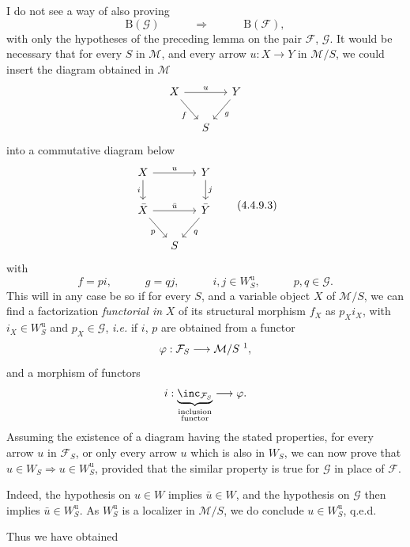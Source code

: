 I do not see a way of also proving
\[
\mathrm{B}(\mathcal{G}) \qquad\quad \Longrightarrow \qquad\quad \mathrm{B}(\mathcal{F}),
\]
with only the hypotheses of the preceding lemma on the pair $\mathcal{F}$, $\mathcal{G}$. It would be necessary that for every $S$ in $\mathcal{M}$, and every arrow
$u : X \longrightarrow Y$ in $\mathcal{M}/S$, we could insert the diagram obtained in $\mathcal{M}$
\[
\begin{tikzcd}[column sep=small]
X \arrow[rr, "u"] \arrow[dr, "f"'] & & Y \arrow[dl, "g"] \\
& S &
\end{tikzcd}
\]
into a commutative diagram below
\[
\begin{tikzcd}[column sep=small]
X \arrow[rr, "u"] \arrow[d, "i"'] & & Y \arrow[d, "j"] \\
\bar{X} \arrow[rr, "\bar{u}"] \arrow[dr, "p"'] & & \bar{Y} \arrow[dl, "q"] \\
& S &
\end{tikzcd}
\tag*{(4.4.9.3)}
\]
with
\[
f = pi, \qquad\quad g = qj, \qquad\quad i, j \in W^{\mathrm{u}}_S, \qquad\quad p, q \in \mathcal{G}.
\]
This will in any case be so if for every $S$, and a variable object $X$ of $\mathcal{M}/S$, we can find a factorization \textit{functorial in} $X$ of its structural morphism $f_X$ as $p_X i_X$, with $i_X \in W^{\mathrm{u}}_S$ and $p_X \in \mathcal{G}$, \textit{i.e.} if $i$, $p$ are obtained from a functor
\[
\varphi : \mathcal{F}_S \longrightarrow \mathcal{M}/S \ \text{\footnotemark},
\]
and a morphism of functors
\[
i : \underbrace{\inc_{\mathcal{F}_S}}_{\substack{\text{inclusion}\\ \text{functor}}} \longrightarrow \varphi.
\]
Assuming the existence of a diagram having the stated properties, for every arrow $u$ in $\mathcal{F}_S$, or only every arrow $u$ which is also in $W_S$, we can now prove that $u \in W_S \Longrightarrow u \in W^{\mathrm{u}}_S$, provided that the similar property is true for $\mathcal{G}$ in place of $\mathcal{F}$.

Indeed, the hypothesis on $u \in W$ implies $\bar{u} \in W$, and the hypothesis on $\mathcal{G}$ then implies $\bar{u} \in W^{\mathrm{u}}_S$. As $W^{\mathrm{u}}_S$ is a localizer in $\mathcal{M}/S$, we do conclude $u \in W^{\mathrm{u}}_S$, q.e.d.

Thus we have obtained

